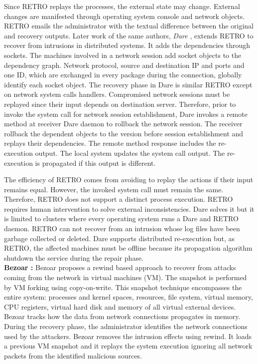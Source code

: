 Since RETRO replays the processes, the external state may change. External changes are manifested through operating system console and network objects. RETRO emails the administrator with the textual difference between the original and recovery outputs. Later work of the same authors, \textit{Dare} \cite{dare}, extends RETRO to recover from intrusions in distributed systems. It adds the dependencies through sockets. The machines involved in a network session add socket objects to the dependency graph. Network protocol, source and destination IP and ports and one ID, which are exchanged in every package during the connection, globally identify each socket object. The recovery phase in Dare is similar RETRO except on network system calls handlers. Compromised network sessions must be replayed since their input depends on destination server. Therefore, prior to invoke the system call for network session establishment, Dare invokes a remote method at receiver Dare daemon to rollback the network session. The receiver rollback the dependent objects to the version before session establishment and replays their dependencies. The remote method response includes the re-execution output. The local system updates the system call output. The re-execution is propagated if this output is different. 

The efficiency of RETRO comes from avoiding to replay the actions if their input remains equal. However, the invoked system call must remain the same. Therefore, RETRO does not support a distinct process execution. RETRO requires human intervention to solve external inconsistencies. Dare solves it but it is limited to clusters where every operating system runs a Dare and RETRO daemon. RETRO can not recover from an intrusion whose log files have been garbage collected or deleted. Dare supports distributed re-execution but, as RETRO, the affected machines must be offline because its propagation algorithm shutdown the service during the repair phase. \\



\textbf{Bezoar \cite{bezoar}:} Bezoar proposes a rewind based approach to recover from attacks coming from the network in virtual machines (VM). The snapshot is performed by VM forking using copy-on-write. This snapshot technique encompasses the entire system: processes and kernel spaces, resources, file system, virtual memory, CPU registers, virtual hard disk and memory of all virtual external devices. Bezoar tracks how the data from network connections propagates in memory. During the recovery phase, the administrator identifies the network connections used by the attackers. Bezoar removes the intrusion effects using rewind. It loads a previous VM snapshot and it replays the system execution ignoring all network packets from the identified malicious sources. 

